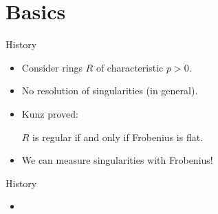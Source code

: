 \documentclass[xcolor=dvipsnames]{beamer}
\subtitle
{The {\tt TestIdeals} package for Macaulay2}
\author[BHKKMRSSTW] %
{Alberto F. Boix, Daniel Hern\'andez, Zhibek Kadyrsizova, Mordechai Katzman, Sara Malec, Marcus Robinson, Karl Schwede\inst{1}, Daniel Smolkin, Pedro Teixeira, Emily Witt}
\institute[AMS Sectional Meeting, University of Arkansas] %
{
  \inst{1}%
  Department of Mathematics\\
  University of Utah}
\date[2018] %
{AMS Sectional Meeting, University of Arkansas\\2018}
\theoremstyle{remark}
\begin{document}
\begin{frame}
  \titlepage
\end{frame}






\section{Basics}

\begin{frame}[t]{History}
\begin{itemize}
\item<1-> Consider rings $R$ of characteristic $p > 0$.  
\item<2-> No resolution of singularities (in general).
\item<3-> Kunz proved:
\vskip 3pt
\begin{theorem}[Kunz]
$R$ is regular if and only if Frobenius is flat.
\end{theorem}
\item<4->  We can measure singularities with Frobenius!
\end{itemize}
\end{frame}

\begin{frame}[t]{History}
\begin{itemize}
\item<1->
\end{itemize}
\end{frame}
\end{document}
